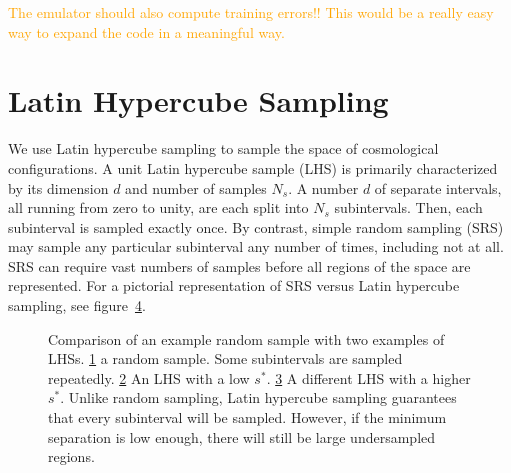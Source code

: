 \textcolor{orange}{The emulator should also compute training errors!! This
would be a really easy way to expand the code in a meaningful way.}

\section{Latin Hypercube Sampling}
\label{sec: lhc}

We use Latin hypercube sampling to sample 
the space of cosmological configurations.
A unit Latin hypercube sample (LHS) is primarily characterized by its 
dimension $d$ and number of samples $N_s$. A number $d$ of separate intervals, 
all running from zero to unity, are
each split into $N_s$ subintervals. Then, each subinterval is sampled
exactly once. By contrast, simple random sampling (SRS) may sample any 
particular subinterval any number of times, including not at all. SRS
can require vast numbers of samples before all regions of the space are
represented. For a pictorial representation of SRS versus Latin hypercube
sampling, see figure~\ref{fig: sample_comparison}.

\begin{figure}[ht!]
    \begin{subfigure}{0.32 \textwidth}
    \centering
 		
 		\caption{}
 		\label{fig: random_sample}
    \end{subfigure}
    \begin{subfigure}{0.32 \textwidth}
    \centering
 		
 		\caption{}
 		\label{fig: poor_lhs}
    \end{subfigure}
    \begin{subfigure}{0.32 \textwidth}
    \centering
 		
 		\caption{}
 		\label{fig: better_lhs}
    \end{subfigure}
    \centering
    \caption[Comparison of SRS and Latin hypercube sampling.]{Comparison of an 
    example
    	random sample with two examples of LHSs.
    	\ref{fig: random_sample} a random sample.
    	Some subintervals are sampled repeatedly.
	\ref{fig: poor_lhs} An LHS with a low $s^*$.    	
    	\ref{fig: better_lhs} A different LHS with a higher $s^*$.
    	Unlike random sampling,
    	Latin hypercube sampling guarantees that every subinterval will be 
    	sampled. However, if
    	the minimum separation is low enough, there will still be large
    	undersampled regions.}
    \label{fig: sample_comparison}
\end{figure}

